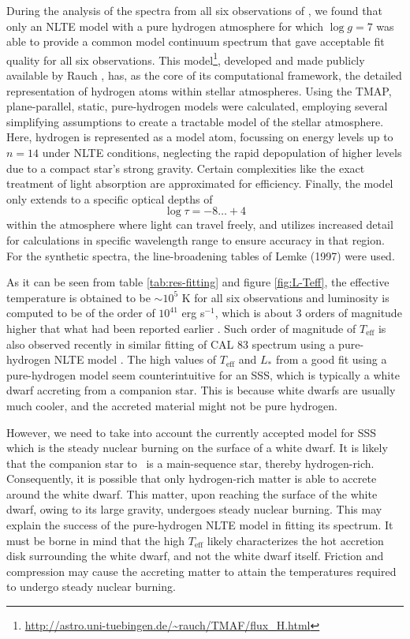 		    During the analysis of the spectra from all six observations of \source, we found that only an NLTE model with a pure hydrogen atmosphere for which $\log{g}=7$ was able to provide a common model continuum spectrum that gave acceptable fit quality for all six observations. This model\footnote{\url{http://astro.uni-tuebingen.de/~rauch/TMAF/flux_H.html}}, developed and made publicly available by Rauch \etal, has, as the core of its computational framework, the detailed representation of hydrogen atoms within stellar atmospheres. Using the TMAP,  plane-parallel, static, pure-hydrogen models were calculated, employing several simplifying assumptions to create a tractable model of the stellar atmosphere. Here, hydrogen is represented as a model atom, focussing on energy levels up to $n=14$ under NLTE conditions, neglecting the rapid depopulation of higher levels due to a compact star's strong gravity. Certain complexities like the exact treatment of light absorption are approximated for efficiency. Finally, the model only extends to a specific optical depths of
		    $$\log{\tau}=-8\dots+4$$
		    within the atmosphere where light can travel freely, and utilizes increased detail for calculations in specific wavelength range to ensure accuracy in that region. For the synthetic spectra, the line-broadening tables of Lemke (1997) \cite{lemke1997extended} were used.
		    
		    As it can be seen from table \ref{tab:res-fitting} and figure \ref{fig:L-Teff}, the effective temperature is obtained to be $\sim 10^5$ K for all six observations and luminosity is computed to be of the order of $10^{41}$ erg s$^{-1}$, which is about 3 orders of magnitude higher that what had been reported earlier \cite{hartmann1999constraining}. Such order of magnitude of $T_\text{eff}$ is also observed recently in similar fitting of CAL 83 spectrum using a pure-hydrogen NLTE model \cite{stecchini2023revisiting}. The high values of $T_\text{eff}$ and $L_*$ from a good fit using a pure-hydrogen model seem counterintuitive for an SSS, which is typically a white dwarf accreting from a companion star. This is because white dwarfs are usually much cooler, and the accreted material might not be pure hydrogen.
    
    		However, we need to take into account the currently accepted model for SSS which is the steady nuclear burning on the surface of a white dwarf. It is likely that the companion star to \source\ is a main-sequence star, thereby hydrogen-rich. Consequently, it is possible that only hydrogen-rich matter is able to accrete around the white dwarf. This matter, upon reaching the surface of the white dwarf, owing to its large gravity, undergoes steady nuclear burning. This may explain the success of the pure-hydrogen NLTE model in fitting its spectrum. It must be borne in mind that the high $T_\text{eff}$ likely characterizes the hot accretion disk surrounding the white dwarf, and not the white dwarf itself. Friction and compression may cause the accreting matter to attain the temperatures required to undergo steady nuclear burning.
    		
